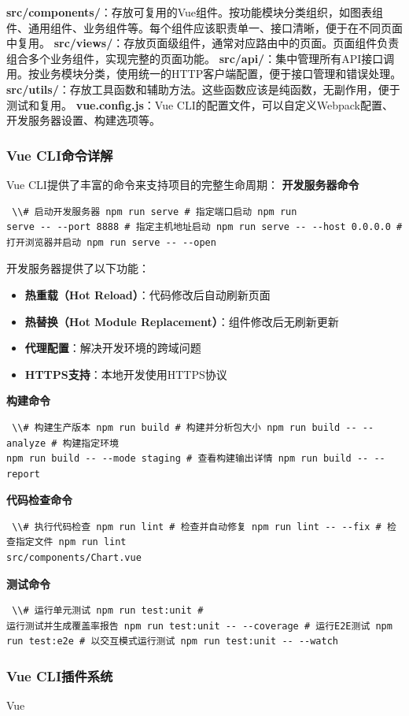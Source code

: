 \textbf{src/components/}：存放可复用的Vue组件。按功能模块分类组织，如图表组件、通用组件、业务组件等。每个组件应该职责单一、接口清晰，便于在不同页面中复用。
\textbf{src/views/}：存放页面级组件，通常对应路由中的页面。页面组件负责组合多个业务组件，实现完整的页面功能。
\textbf{src/api/}：集中管理所有API接口调用。按业务模块分类，使用统一的HTTP客户端配置，便于接口管理和错误处理。
\textbf{src/utils/}：存放工具函数和辅助方法。这些函数应该是纯函数，无副作用，便于测试和复用。 \textbf{vue.config.js}：Vue
CLI的配置文件，可以自定义Webpack配置、开发服务器设置、构建选项等。 \subsubsection{Vue CLI命令详解}\label{vue-cliux547dux4ee4ux8be6ux89e3} Vue
CLI提供了丰富的命令来支持项目的完整生命周期： \textbf{开发服务器命令} \begin{lstlisting} \\# 启动开发服务器 npm run serve # 指定端口启动 npm run
serve -- --port 8888 # 指定主机地址启动 npm run serve -- --host 0.0.0.0 # 打开浏览器并启动 npm run serve -- --open \end{lstlisting}
开发服务器提供了以下功能： \begin{itemize} \tightlist \item \textbf{热重载（Hot Reload）}：代码修改后自动刷新页面 \item \textbf{热替换（Hot Module
Replacement）}：组件修改后无刷新更新 \item \textbf{代理配置}：解决开发环境的跨域问题 \item \textbf{HTTPS支持}：本地开发使用HTTPS协议 \end{itemize}
\textbf{构建命令} \begin{lstlisting} \\# 构建生产版本 npm run build # 构建并分析包大小 npm run build -- --analyze # 构建指定环境
npm run build -- --mode staging # 查看构建输出详情 npm run build -- --report \end{lstlisting} \textbf{代码检查命令}
\begin{lstlisting} \\# 执行代码检查 npm run lint # 检查并自动修复 npm run lint -- --fix # 检查指定文件 npm run lint
src/components/Chart.vue \end{lstlisting} \textbf{测试命令} \begin{lstlisting} \\# 运行单元测试 npm run test:unit #
运行测试并生成覆盖率报告 npm run test:unit -- --coverage # 运行E2E测试 npm run test:e2e # 以交互模式运行测试 npm run test:unit -- --watch
\end{lstlisting} \subsubsection{Vue CLI插件系统}\label{vue-cliux63d2ux4ef6ux7cfbux7edf} Vue
